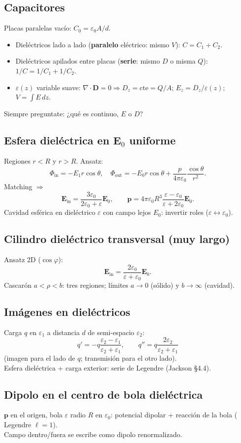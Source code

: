\documentclass[10pt,a4paper]{article}
\newcommand{\vect}[1]{\mathbf{#1}}
\newcommand{\eps}{\varepsilon}
\newcommand{\epso}{\varepsilon_0}
\begin{document}
\subsection{Capacitores}
Placas paralelas vacío: $C_0=\epso A/d$.\\
\begin{itemize}
\item Dieléctricos lado a lado (\textbf{paralelo} eléctrico: mismo $V$): $C=C_1+C_2$.
\item Dieléctricos apilados entre placas (\textbf{serie}: mismo $D$ o misma $Q$): $1/C=1/C_1+1/C_2$.
\item $\eps(z)$ variable suave: $\nabla\cdot\vect{D}=0\Rightarrow D_z=\mathrm{cte}=Q/A$; $E_z=D_z/\eps(z)$; $V=\int E\,dz$.
\end{itemize}
Siempre preguntate: ¿qué es continuo, $E$ o $D$?

\subsection{Esfera dieléctrica en $\vect{E}_0$ uniforme}
Regiones $r<R$ y $r>R$. Ansatz:
\[
\Phi_{\mathrm{in}}=-E_1 r\cos\theta,\quad
\Phi_{\mathrm{out}}=-E_0 r\cos\theta+\frac{p}{4\pi\epso}\frac{\cos\theta}{r^2}.
\]
Matching $\Rightarrow$
\[
\vect{E}_{\mathrm{in}}=\frac{3\epso}{2\epso+\eps}\vect{E}_0,\qquad
\vect{p}=4\pi\epso R^3\frac{\eps-\epso}{\eps+2\epso}\vect{E}_0.
\]
Cavidad esférica en dieléctrico $\eps$ con campo lejos $E_0$: invertir roles ($\eps\leftrightarrow\epso$).

\subsection{Cilindro dieléctrico transversal (muy largo)}
Ansatz 2D ($\cos\varphi$):
\[
\vect{E}_{\mathrm{in}}=\frac{2\epso}{\eps+\epso}\vect{E}_0.
\]
Cascarón $a<\rho<b$: tres regiones; límites $a\to 0$ (sólido) y $b\to\infty$ (cavidad).

\subsection{Imágenes en dieléctricos}
Carga $q$ en $\eps_1$ a distancia $d$ de semi-espacio $\eps_2$:
\[
q'=-q\frac{\eps_2-\eps_1}{\eps_2+\eps_1},\qquad
q''=q\frac{2\eps_2}{\eps_2+\eps_1}
\]
(imagen para el lado de $q$; transmisión para el otro lado).\\
Esfera dieléctrica + carga exterior: serie de Legendre (Jackson §4.4).

\subsection{Dipolo en el centro de bola dieléctrica}
$\vect{p}$ en el origen, bola $\eps$ radio $R$ en $\epso$: potencial dipolar + reacción de la bola ( Legendre $\ell=1$).\\
Campo dentro/fuera se escribe como dipolo renormalizado.
\end{document}
